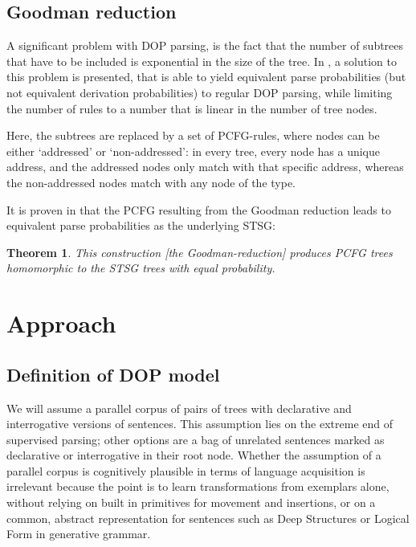\documentclass[a4paper]{article}
\newtheorem{theorem}{Theorem}[section]
\theoremstyle{definition}
\begin{document}
\subsection{Goodman reduction}

A significant problem with DOP parsing, is the fact that the number of subtrees
that have to be included is exponential in the size of the tree. In
\citet{goodman2003efficient}, a solution to this problem is presented, that is
able to yield equivalent parse probabilities (but not equivalent derivation
probabilities) to regular DOP parsing, while limiting the number of rules to a
number that is linear in the number of tree nodes.

Here, the subtrees are replaced by a set of PCFG-rules, where nodes can be
either `addressed' or `non-addressed': in every tree, every node has a unique
address, and the addressed nodes only match with that specific address, whereas
the non-addressed nodes match with any node of the type.

It is proven in \citet{goodman2003efficient} that the PCFG resulting from the
Goodman reduction leads to equivalent parse probabilities as the underlying
STSG:

\begin{theorem}
This construction [the Goodman-reduction] produces PCFG trees homomorphic to
the STSG trees with equal probability.
\end{theorem}

\section{Approach}
\label{sec:approach}

\subsection{Definition of DOP model}

We will assume a parallel corpus of pairs of trees with declarative and
interrogative versions of sentences. This assumption lies on the extreme
end of supervised parsing; other options are a bag of unrelated sentences
marked as declarative or interrogative in their root node. Whether the
assumption of a parallel corpus is cognitively plausible in terms of
language acquisition is irrelevant because the point is to learn
transformations from exemplars alone, without relying on built in primitives
for movement and insertions, or on a common, abstract representation for
sentences such as Deep Structures or Logical Form in generative grammar.
\end{document}
